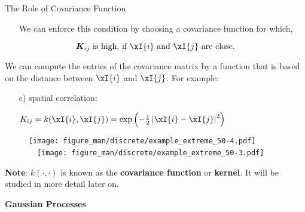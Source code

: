 \begin{frame}[c,allowframebreaks]{The Role of Covariance Function}
\begin{itemize}
  \lz
  
  \item[\faLightbulbO] We can enforce this condition by choosing a covariance function for which,  
\end{itemize}
 $$\bm{K}_{ij} \text{ is high, if } \xI{i} \text{ and } \xI{j} \text{ are close.}$$



\framebreak


We can compute the entries of the covariance matrix by a function that is based on the distance between $\xI{i}$ and $\xI{j}$. For example: 

\begin{enumerate}
    \item[c)] spatial correlation: \begin{footnotesize}$K_{ij} = k(\xI{i}, \xI{j}) = \exp\left(-\frac{1}{2}\left|\xI{i} - \xI{j}\right|^2\right)$\end{footnotesize}
\end{enumerate}
  
\begin{figure}
  \texttt{[image: figure\_man/discrete/example\_extreme\_50-4.pdf]} ~~\texttt{[image: figure\_man/discrete/example\_extreme\_50-3.pdf]}
\end{figure}


\begin{footnotesize}
\textbf{Note}: $k(\cdot,\cdot)$ is known as the \textbf{covariance function} or \textbf{kernel}. It will be studied in more detail later on.
\end{footnotesize}

\end{frame}

\begin{frame}[c]{}
\centering
\huge
\textbf{Gaussian Processes}
\end{frame}


